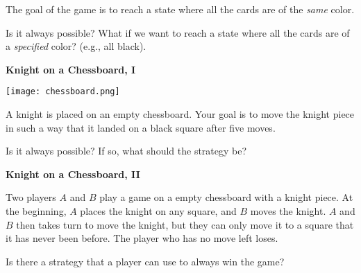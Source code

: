 \documentclass[answers,a4paper,11pt]{exam}
\begin{document}
\begin{questions}
The goal of the game is to reach a state where all the cards are of the \textit{same} color.

Is it always possible?  What if we want to reach a state where all the cards are of a \textit{specified} color? (e.g., all black).

\fillwithdottedlines{5in}

\newpage
\question
\textbf{Knight on a Chessboard, I}

\begin{center}
\texttt{[image: chessboard.png]}
\end{center}

A knight is placed on an empty chessboard.  Your goal is to move the knight piece in such a way that it landed on a black square after five moves.

Is it always possible?  If so, what should the strategy be?

\fillwithdottedlines{5in}

\newpage
\question
\textbf{Knight on a Chessboard, II}

Two players $A$ and $B$ play a game on a empty chessboard with a knight piece. 
At the beginning, $A$ places the knight on any square, and $B$ moves the knight.
$A$ and $B$ then takes turn to move the knight, but they can only move it to a square that it has never been before.  The player who has no move left loses.

Is there a strategy that a player can use to always win the game?

\fillwithdottedlines{5in}

\end{questions}
\end{document}
